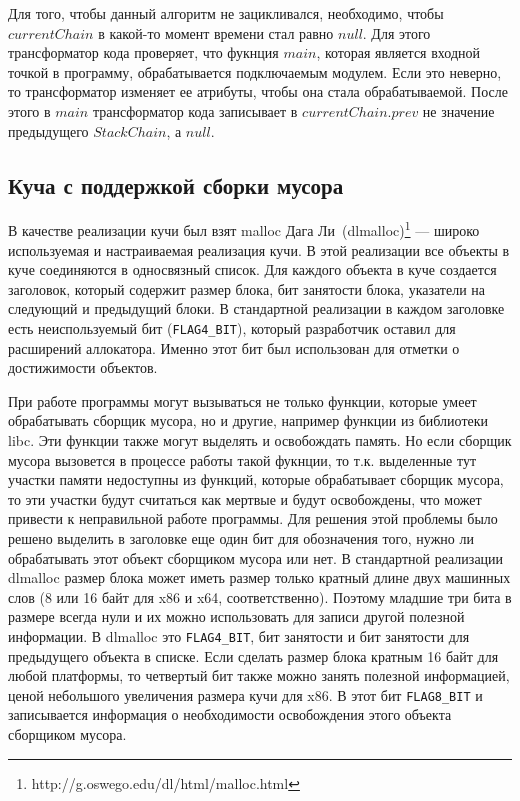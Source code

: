 Для того, чтобы данный алгоритм не зацикливался, необходимо, чтобы $currentChain$ в какой-то момент времени стал равно $null$.
Для этого трансформатор кода проверяет, что фукнция $main$, которая является входной точкой в программу, обрабатывается подключаемым модулем. Если это неверно, то трансформатор изменяет ее атрибуты, чтобы она стала обрабатываемой. После этого в $main$ трансформатор кода записывает в $currentChain.prev$ не значение предыдущего $StackChain$, а $null$.   

\subsection{Куча с поддержкой сборки мусора}
В качестве реализации кучи был взят malloc Дага Ли~(dlmalloc)\footnote{http://g.oswego.edu/dl/html/malloc.html} --- широко используемая и настраиваемая реализация кучи. В этой реализации все объекты в куче соединяются в односвязный список. Для каждого объекта в куче создается заголовок, который содержит размер блока, бит занятости блока, указатели на следующий и предыдущий блоки. В стандартной реализации в каждом заголовке есть неиспользуемый бит (\texttt{FLAG4\_BIT}), который разработчик оставил для расширений аллокатора. Именно этот бит был использован для отметки о достижимости объектов. 

При работе программы могут вызываться не только функции, которые умеет обрабатывать сборщик мусора, но и другие, например функции из библиотеки libc. Эти функции также могут выделять и освобождать память. Но если сборщик мусора вызовется в процессе работы такой фукнции, то т.к. выделенные тут участки памяти недоступны из функций, которые обрабатывает сборщик мусора, то эти участки будут считаться как мертвые и будут освобождены, что может привести к неправильной работе программы. Для решения этой проблемы было решено выделить в заголовке еще один бит для обозначения того, нужно ли обрабатывать этот объект сборщиком мусора или нет. В стандартной реализации dlmalloc размер блока может иметь размер только кратный длине двух машинных слов (8 или 16 байт для x86 и x64, соответственно). Поэтому младшие три бита в размере всегда нули и их можно использовать для записи другой полезной информации. В dlmalloc это \texttt{FLAG4\_BIT}, бит занятости и бит занятости для предыдущего объекта в списке. Если сделать размер блока кратным 16 байт для любой платформы, то четвертый бит также можно занять полезной информацией, ценой небольшого увеличения размера кучи для x86. В этот бит \texttt{FLAG8\_BIT} и записывается информация о необходимости освобождения этого объекта сборщиком мусора.

